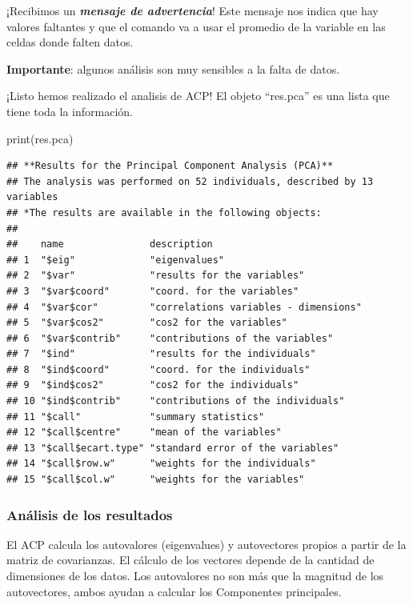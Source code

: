 \documentclass[
]{book}
\newenvironment{Shaded}{\begin{snugshade}}{\end{snugshade}}
\newcommand{\FunctionTok}[1]{\textcolor[rgb]{0.00,0.00,0.00}{#1}}
\newcommand{\NormalTok}[1]{#1}
\begin{document}
¡Recibimos un \textbf{\emph{mensaje de advertencia}}! Este mensaje nos indica que hay valores faltantes y que el comando va a usar el promedio de la variable en las celdas donde falten datos.

\textbf{Importante}: algunos análisis son muy sensibles a la falta de datos.

¡Listo hemos realizado el analisis de ACP! El objeto ``res.pca'' es una lista que tiene toda la información.

\begin{Shaded}
\begin{Highlighting}[]
\FunctionTok{print}\NormalTok{(res.pca)}
\end{Highlighting}
\end{Shaded}

\begin{verbatim}
## **Results for the Principal Component Analysis (PCA)**
## The analysis was performed on 52 individuals, described by 13 variables
## *The results are available in the following objects:
## 
##    name               description                          
## 1  "$eig"             "eigenvalues"                        
## 2  "$var"             "results for the variables"          
## 3  "$var$coord"       "coord. for the variables"           
## 4  "$var$cor"         "correlations variables - dimensions"
## 5  "$var$cos2"        "cos2 for the variables"             
## 6  "$var$contrib"     "contributions of the variables"     
## 7  "$ind"             "results for the individuals"        
## 8  "$ind$coord"       "coord. for the individuals"         
## 9  "$ind$cos2"        "cos2 for the individuals"           
## 10 "$ind$contrib"     "contributions of the individuals"   
## 11 "$call"            "summary statistics"                 
## 12 "$call$centre"     "mean of the variables"              
## 13 "$call$ecart.type" "standard error of the variables"    
## 14 "$call$row.w"      "weights for the individuals"        
## 15 "$call$col.w"      "weights for the variables"
\end{verbatim}

\hypertarget{anuxe1lisis-de-los-resultados}{%
\subsubsection{Análisis de los resultados}\label{anuxe1lisis-de-los-resultados}}

El ACP calcula los autovalores (eigenvalues) y autovectores propios a partir de la matriz de covarianzas. El cálculo de los vectores depende de la cantidad de dimensiones de los datos. Los autovalores no son más que la magnitud de los autovectores, ambos ayudan a calcular los Componentes principales.
\end{document}
